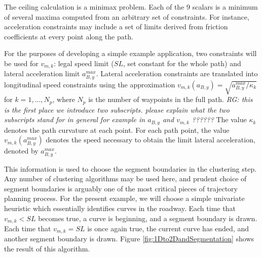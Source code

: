 \documentclass[letterpaper, 10 pt, conference]{ieeeconf}  %
\begin{document}
The ceiling calculation is a minimax problem.
Each of the 9 scalars is a minimum of several maxima computed from an arbitrary set of constraints.
For instance, acceleration constraints may include a set of limits derived from friction coefficients at every point along the path.


For the purposes of developing a simple example application, two constraints will be used for $v_{m,k}$: legal speed limit ($SL$, set constant for the whole path) and lateral acceleration limit $a_{B,y}^{max}$. 
Lateral acceleration constraints are translated into longitudinal speed constraints using the approximation $v_{m,k}(a_{B,y}) = \sqrt{a_{B,y}^{max}/\kappa_k}$ for $k = 1, ..., N_p$, where $N_p$ is the number of waypoints in the full path.
\emph{RG: this is the first place we introduce two subscripts. please explain what the two subscripts stand for in general for example in $a_{B,y}$ and $v_{m,k}$ ?????? }
The value $\kappa_k$ denotes the path curvature at each point.
For each path point, the value $v_{m,k}(a_{B,y}^{max})$ denotes the speed necessary to obtain the limit lateral acceleration, denoted by $a^{max}_{B,y}$.

This information is used to choose the segment boundaries in the clustering step.
Any number of clustering algorithms may be used here, and prudent choice of segment boundaries is arguably one of the most critical pieces of trajectory planning process.
For the present example, we will choose a simple univariate heuristic which essentially identifies curves in the roadway.
Each time that $v_{m,k} < SL$ becomes true, a curve is beginning, and a segment boundary is drawn.
Each time that $v_{m,k} = SL$ is once again true, the current curve has ended, and another segment boundary is drawn.
Figure \ref{fig:1Dto2DandSegmentation} shows the result of this algorithm. 


\end{document}
